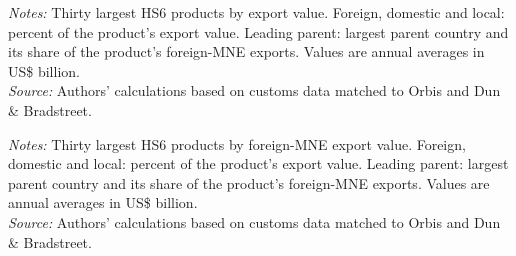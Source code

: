 \documentclass[11pt,a4paper]{article}
\begin{document}
\begin{table}[H]\centering\footnotesize%
  \caption{Manufacturing: Thirty Largest Export Products}%
  \label{tab:hs_by_value_manufacturing}%
  \par\vspace{3pt}%
  \begin{minipage}{0.95\textwidth}\footnotesize %
  \textit{Notes:} Thirty largest HS6 products by export value. Foreign, domestic and local: percent of the product's export value. Leading parent: largest parent country and its share of the product's foreign-MNE exports. Values are annual averages in US\$ billion.\\[3pt]%
  \textit{Source:} Authors' calculations based on customs data matched to Orbis and Dun \& Bradstreet.%
  \end{minipage}%
  \end{table}
\begin{table}[H]\centering\footnotesize%
  \caption{Manufacturing: Thirty Largest Export Products of Foreign Multinationals}%
  \label{tab:hs_by_foreign_value_manufacturing}%
  \par\vspace{3pt}%
  \begin{minipage}{0.95\textwidth}\footnotesize %
  \textit{Notes:} Thirty largest HS6 products by foreign-MNE export value. Foreign, domestic and local: percent of the product's export value. Leading parent: largest parent country and its share of the product's foreign-MNE exports. Values are annual averages in US\$ billion.\\[3pt]%
  \textit{Source:} Authors' calculations based on customs data matched to Orbis and Dun \& Bradstreet.%
  \end{minipage}%
  \end{table}
\end{document}
